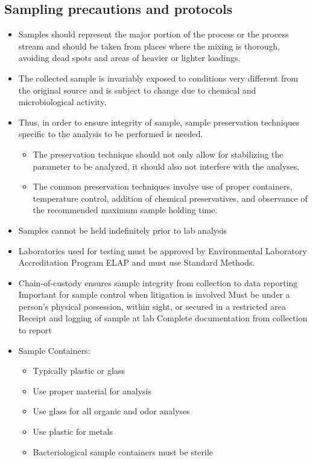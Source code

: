 \subsection{Sampling precautions and protocols}
			\begin{itemize}
				\item Samples should represent the major portion of the process or the process stream and should be taken from places where the mixing is thorough, avoiding dead spots and areas of heavier or lighter loadings. 
				\item The collected sample is invariably exposed to conditions very different from the original source and is subject to change due to chemical and microbiological activity.  
				\item Thus, in order to ensure integrity of sample, sample preservation techniques specific to the analysis to be performed is needed.  
				      \begin{itemize}
				      	\item The preservation technique should not only allow for stabilizing the parameter to be analyzed, it should also not interfere with the analyses.  
				      	\item The common preservation techniques involve use of proper containers, temperature control, addition of chemical preservatives, and observance of the recommended maximum sample holding time.
				      \end{itemize}
				      \item Samples cannot be held indefinitely prior to lab analysis
\item  Laboratories used for testing must be approved by Environmental Laboratory Accreditation Program {ELAP}  and must use Standard Methods.
\item Chain-of-custody ensures sample integrity from collection to data reporting Important for sample control when litigation is involved Must be under a person’s physical possession, within sight, or secured in a restricted area Receipt and logging of sample at lab Complete documentation from collection to report
\item Sample Containers:
\begin{itemize}
\item Typically plastic or glass
\item Use proper material for analysis
\item Use glass for all organic and odor analyses
\item Use plastic for metals
\item Bacteriological sample containers must be sterile
\end{itemize}
\end{itemize}

